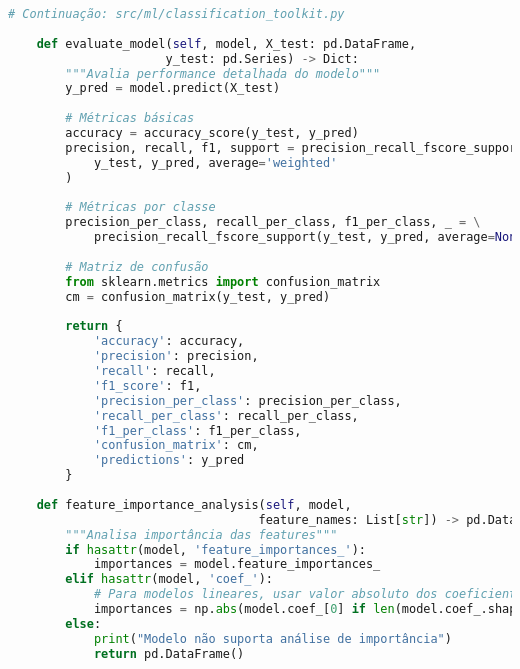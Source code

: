 \newpage

\begin{pythonbox}
\begin{lstlisting}[language=Python]
# Continuação: src/ml/classification_toolkit.py
    
    def evaluate_model(self, model, X_test: pd.DataFrame, 
                      y_test: pd.Series) -> Dict:
        """Avalia performance detalhada do modelo"""
        y_pred = model.predict(X_test)
        
        # Métricas básicas
        accuracy = accuracy_score(y_test, y_pred)
        precision, recall, f1, support = precision_recall_fscore_support(
            y_test, y_pred, average='weighted'
        )
        
        # Métricas por classe
        precision_per_class, recall_per_class, f1_per_class, _ = \
            precision_recall_fscore_support(y_test, y_pred, average=None)
        
        # Matriz de confusão
        from sklearn.metrics import confusion_matrix
        cm = confusion_matrix(y_test, y_pred)
        
        return {
            'accuracy': accuracy,
            'precision': precision,
            'recall': recall,
            'f1_score': f1,
            'precision_per_class': precision_per_class,
            'recall_per_class': recall_per_class,
            'f1_per_class': f1_per_class,
            'confusion_matrix': cm,
            'predictions': y_pred
        }
    
    def feature_importance_analysis(self, model, 
                                   feature_names: List[str]) -> pd.DataFrame:
        """Analisa importância das features"""
        if hasattr(model, 'feature_importances_'):
            importances = model.feature_importances_
        elif hasattr(model, 'coef_'):
            # Para modelos lineares, usar valor absoluto dos coeficientes
            importances = np.abs(model.coef_[0] if len(model.coef_.shape) > 1 else model.coef_)
        else:
            print("Modelo não suporta análise de importância")
            return pd.DataFrame()
\end{lstlisting}
\end{pythonbox}
